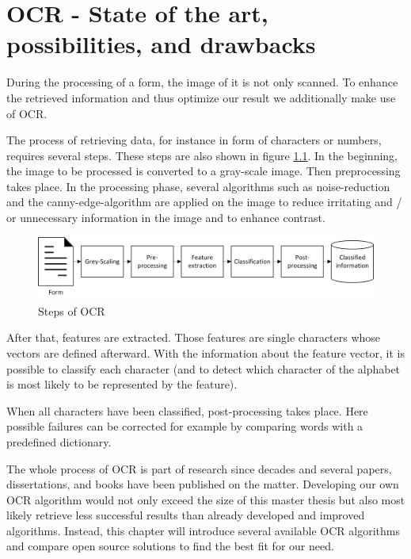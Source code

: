 %
% 
\chapter{OCR - State of the art, possibilities, and drawbacks}
\label{cha3}

During the processing of a form, the image of it is not only scanned. To enhance the retrieved information and thus optimize our result we additionally make use of OCR.%

The process of retrieving data, for instance in form of characters or numbers, requires several steps. These steps are also shown in figure \ref{ocrSteps}. In the beginning, the image to be processed is converted to a gray-scale image. Then preprocessing takes place. In the processing phase, several algorithms such as noise-reduction and the canny-edge-algorithm are applied on the image to reduce irritating and / or unnecessary information in the image and to enhance contrast.

\begin{figure}[htbp!]
\centering
\includegraphics[scale=0.9]{Images/OCR/Steps_Of_OCR.png}
\caption{Steps of OCR \label{ocrSteps}}
\end{figure}

After that, features are extracted. Those features are single characters whose vectors are defined afterward. With the information about the feature vector, it is possible to classify each character (and to detect which character of the alphabet is most likely to be represented by the feature).

When all characters have been classified, post-processing takes place. Here possible failures can be corrected for example by comparing words with a predefined dictionary.

The whole process of OCR is part of research since decades and several papers, dissertations, and books have been published on the matter\cite{impedovo91}\cite{Mori99}\cite{Wang15}. Developing our own OCR algorithm would not only exceed the size of this master thesis but also most likely retrieve less successful results than already developed and improved algorithms. Instead, this chapter will introduce several available OCR algorithms and compare open source solutions to find the best fit for our need.

